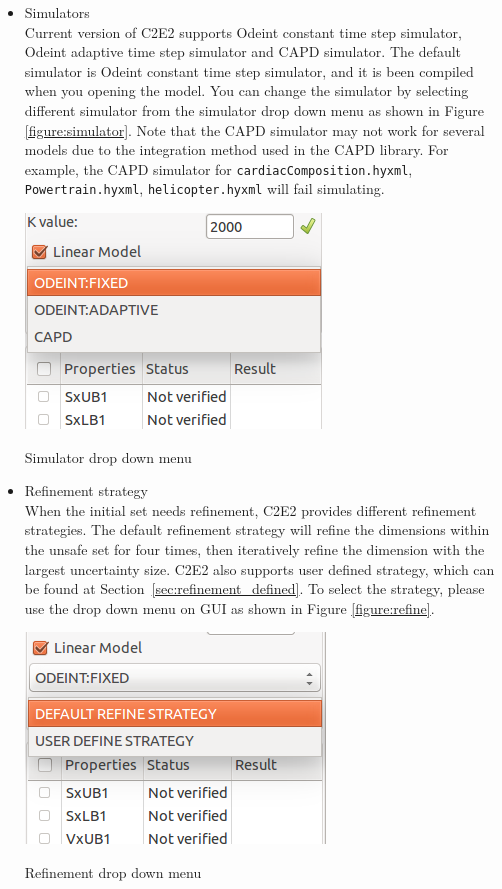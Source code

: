 \documentclass{tufte-book} %
\begin{document}
\begin{itemize}
\item {Simulators}\\
Current version of C2E2 supports Odeint constant time step simulator, Odeint adaptive time step simulator and CAPD simulator. The default simulator is Odeint constant time step simulator, and it is been compiled when you opening the model. You can change the simulator by selecting different simulator from the simulator drop down menu as shown in Figure \ref{figure:simulator}. Note that the CAPD simulator may not work for several models due to the integration method used in the CAPD library. For example, the CAPD simulator for  \texttt{cardiacComposition.hyxml}, \texttt{Powertrain.hyxml}, \texttt{helicopter.hyxml} will fail simulating. 

\begin{marginfigure}
\centerline{\includegraphics[scale=.24,keepaspectratio=true]{Manual_ver0_2_image/simulator.png}}
 \caption{Simulator drop down menu} 
 \label{figure:simulator}
\end{marginfigure}

\item {Refinement strategy}\\
When the initial set needs refinement, C2E2 provides different refinement strategies. The default refinement strategy will refine the dimensions within the unsafe set for four times, then iteratively refine the dimension with the largest uncertainty size. C2E2 also supports user defined strategy, which can be found at Section~\ref{sec:refinement_defined}. To select the strategy, please use the drop down menu on GUI as shown in Figure \ref{figure:refine}.


\begin{marginfigure}
\centerline{\includegraphics[scale=.24,keepaspectratio=true]{Manual_ver0_2_image/refine.png}}
 \caption{Refinement drop down menu} 
 \label{figure:refine}
\end{marginfigure}

\end{itemize}
\end{document}
